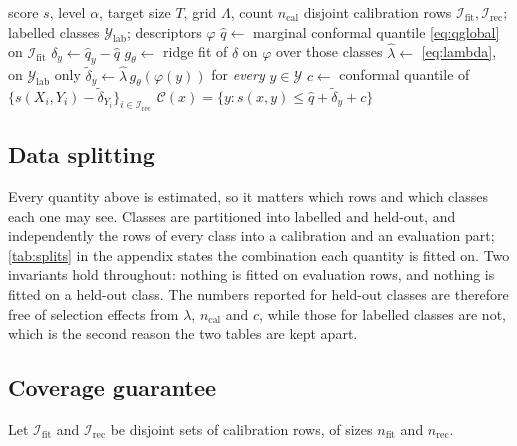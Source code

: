 \begin{algorithm}[t]
\small
\caption{Predicted Class Correction}
\label{alg:pcc}
\begin{algorithmic}[1]
\Require score $s$, level $\alpha$, target size $T$, grid $\Lambda$, count $n_{\mathrm{cal}}$
\Require disjoint calibration rows $\mathcal{I}_{\mathrm{fit}},\mathcal{I}_{\mathrm{rec}}$;
         labelled classes $\mathcal{Y}_{\mathrm{lab}}$; descriptors $\varphi$
\State $\hat q \gets$ marginal conformal quantile \eqref{eq:qglobal} on
       $\mathcal{I}_{\mathrm{fit}}$
  \State $\delta_y \gets \hat q_y - \hat q$ 
\EndFor
\State $g_\theta \gets$ ridge fit of $\delta$ on $\varphi$ over those classes
\State $\hat\lambda \gets$ \eqref{eq:lambda}, on $\mathcal{Y}_{\mathrm{lab}}$ only
\State $\tilde\delta_y \gets \hat\lambda\, g_\theta(\varphi(y))$ for \emph{every}
       $y\in\mathcal{Y}$ 
\State $c \gets$ conformal quantile of
       $\{s(X_i,Y_i)-\tilde\delta_{Y_i}\}_{i\in\mathcal{I}_{\mathrm{rec}}}$
\State \Return $\mathcal{C}(x)=\{y : s(x,y)\le \hat q+\tilde\delta_y+c\}$
\end{algorithmic}
\end{algorithm}

\subsection{Data splitting}
\label{sec:splits}

Every quantity above is estimated, so it matters which rows and which classes each one may
see. Classes are partitioned into labelled and held-out, and independently the rows of every
class into a calibration and an evaluation part; \cref{tab:splits} in the appendix states the
combination each quantity is fitted on. Two invariants hold throughout: nothing is fitted on evaluation rows,
and nothing is fitted on a held-out class. The numbers reported for held-out classes are
therefore free of selection effects from $\lambda$, $n_{\mathrm{cal}}$ and $c$, while those for
labelled classes are not, which is the second reason the two tables are kept apart.


\subsection{Coverage guarantee}
\label{sec:guarantee}

Let $\mathcal{I}_{\mathrm{fit}}$ and $\mathcal{I}_{\mathrm{rec}}$ be disjoint sets of
calibration rows, of sizes $n_{\mathrm{fit}}$ and $n_{\mathrm{rec}}$.

